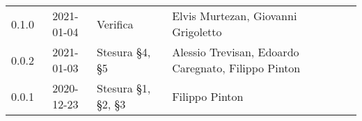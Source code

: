 {\begin{longtable}{ c c  C{3.5cm}  C{4cm}  c }
    0.1.0                  & 2021-01-04                                       & Verifica                                    & Elvis Murtezan, Giovanni Grigoletto                 & \verificatore{} \\
    0.0.2                  & 2021-01-03                                        & Stesura §4, §5                              & Alessio Trevisan, Edoardo Caregnato, Filippo Pinton & \analista{}    \\
    0.0.1                  & 2020-12-23                                       & Stesura §1, §2, §3                          & Filippo Pinton                                      & \analista{}    \\
\end{longtable}
}